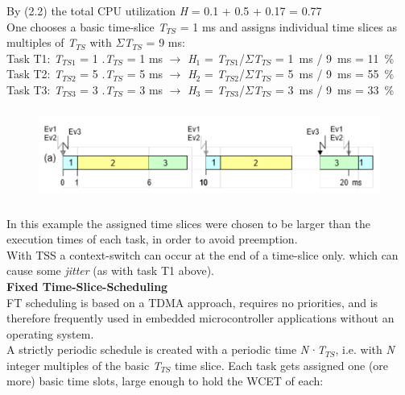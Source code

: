 By (2.2) the total CPU utilization \textit{H} = 0.1 + 0.5 + 0.17 = 0.77 \\

One chooses a basic time-slice \textit{T}${}_{TS}$ = 1 ms and assigns individual time slices as multiples of \textit{T}${}_{TS}$ with $\Sigma$\textit{T}${}_{TS}$ = 9 ms:\\

Task T1:    \textit{T}${}_{TS1}$ = 1 $.$\textit{T}${}_{TS}$ = 1 ms $\rightarrow$ \textit{H}${}_{1}$ = \textit{T}${}_{TS1}$/$\Sigma$\textit{T}${}_{TS}$ = 1~ms / 9~ms = 11~\%\\
Task T2:    \textit{T}${}_{TS2}$ = 5 $.$\textit{T}${}_{TS}$ = 5 ms $\rightarrow$ \textit{H}${}_{2}$ = \textit{T}${}_{TS2}$/$\Sigma$\textit{T}${}_{TS}$ = 5~ms / 9~ms = 55~\%\\
Task T3:     \textit{T}${}_{TS3}$ = 3 $.$\textit{T}${}_{TS}$ = 3 ms $\rightarrow$ \textit{H}${}_{3}$ = \textit{T}${}_{TS3}$/$\Sigma$\textit{T}${}_{TS}$ = 3~ms / 9~ms = 33~\%

	\begin{figure}[h]
    \centering
    \includegraphics[width=13cm, height=3cm]{Images/image91.png}
    \label{fig:Fig }
    \end{figure}

In this example the assigned time slices were chosen to be larger than the execution times of each task, in order to avoid preemption.\\

With TSS a context-switch can occur at the end of a time-slice only. which can cause some \textit{jitter} (as with task T1 above).\\

{\rot\bf Fixed Time-Slice-Scheduling }\\

FT scheduling is based on a TDMA approach, requires no priorities, and is therefore frequently used in embedded microcontroller applications without an operating system.\\

A strictly periodic schedule is created with a periodic time \textit{N·T${}_{TS}$}, i.e. with \textit{N} integer multiples of the basic \textit{T${}_{TS}$} time slice. Each task gets assigned one (ore more) basic time slots, large enough to hold the WCET of each:\\

